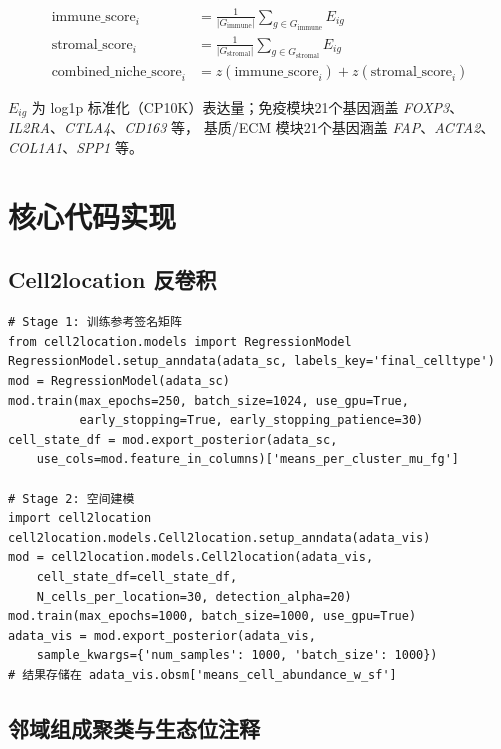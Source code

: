 \documentclass[12pt, a4paper]{ctexart}
\begin{document}
\begin{align}
\text{immune\_score}_i &= \frac{1}{|G_{\text{immune}}|}\sum_{g \in G_{\text{immune}}} E_{ig} \\
\text{stromal\_score}_i &= \frac{1}{|G_{\text{stromal}}|}\sum_{g \in G_{\text{stromal}}} E_{ig} \\
\text{combined\_niche\_score}_i &= z(\text{immune\_score}_i) + z(\text{stromal\_score}_i)
\end{align}

$E_{ig}$ 为 log1p 标准化（CP10K）表达量；免疫模块21个基因涵盖 \textit{FOXP3}、\textit{IL2RA}、\textit{CTLA4}、\textit{CD163} 等，
基质/ECM 模块21个基因涵盖 \textit{FAP}、\textit{ACTA2}、\textit{COL1A1}、\textit{SPP1} 等。

\section{核心代码实现}
\label{app:code}

\subsection{Cell2location 反卷积}

\begin{lstlisting}[caption={RegressionModel 训练与空间建模核心代码}]
# Stage 1: 训练参考签名矩阵
from cell2location.models import RegressionModel
RegressionModel.setup_anndata(adata_sc, labels_key='final_celltype')
mod = RegressionModel(adata_sc)
mod.train(max_epochs=250, batch_size=1024, use_gpu=True,
          early_stopping=True, early_stopping_patience=30)
cell_state_df = mod.export_posterior(adata_sc,
    use_cols=mod.feature_in_columns)['means_per_cluster_mu_fg']

# Stage 2: 空间建模
import cell2location
cell2location.models.Cell2location.setup_anndata(adata_vis)
mod = cell2location.models.Cell2location(adata_vis,
    cell_state_df=cell_state_df,
    N_cells_per_location=30, detection_alpha=20)
mod.train(max_epochs=1000, batch_size=1000, use_gpu=True)
adata_vis = mod.export_posterior(adata_vis,
    sample_kwargs={'num_samples': 1000, 'batch_size': 1000})
# 结果存储在 adata_vis.obsm['means_cell_abundance_w_sf']
\end{lstlisting}

\subsection{邻域组成聚类与生态位注释}
\end{document}
